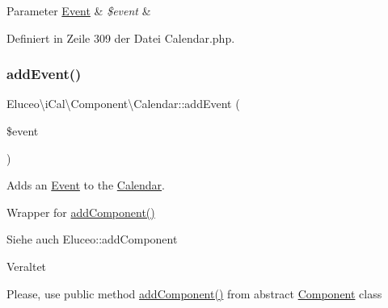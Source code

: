 \begin{DoxyParams}[1]{Parameter}
\mbox{\hyperlink{class_eluceo_1_1i_cal_1_1_component_1_1_event}{Event}} & {\em \$event} & \\
\hline
\end{DoxyParams}


Definiert in Zeile 309 der Datei Calendar.\+php.

\mbox{\label{class_eluceo_1_1i_cal_1_1_component_1_1_calendar_a1f0cf8d3ca1bfee4d03b352d2f6d1698}} 
\subsubsection{\texorpdfstring{add\+Event()}{addEvent()}\hspace{0.1cm}{\footnotesize\ttfamily [3/3]}}
{\footnotesize\ttfamily Eluceo\textbackslash{}i\+Cal\textbackslash{}\+Component\textbackslash{}\+Calendar\+::add\+Event (\begin{DoxyParamCaption}\item[{\mbox{\hyperlink{class_eluceo_1_1i_cal_1_1_component_1_1_event}{Event}}}]{\$event }\end{DoxyParamCaption})}

Adds an \mbox{\hyperlink{class_eluceo_1_1i_cal_1_1_component_1_1_event}{Event}} to the \mbox{\hyperlink{class_eluceo_1_1i_cal_1_1_component_1_1_calendar}{Calendar}}.

Wrapper for \mbox{\hyperlink{class_eluceo_1_1i_cal_1_1_component_a5adac138a8cda08ed3c60b298cc9e145}{add\+Component()}}

\begin{DoxySeeAlso}{Siehe auch}
Eluceo\+::add\+Component 
\end{DoxySeeAlso}
\begin{DoxyRefDesc}{Veraltet}
\item[\mbox{\hyperlink{deprecated__deprecated000026}{Veraltet}}]Please, use public method \mbox{\hyperlink{class_eluceo_1_1i_cal_1_1_component_a5adac138a8cda08ed3c60b298cc9e145}{add\+Component()}} from abstract \mbox{\hyperlink{class_eluceo_1_1i_cal_1_1_component}{Component}} class\end{DoxyRefDesc}



